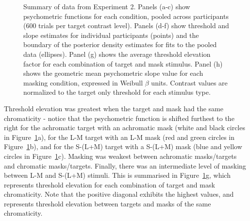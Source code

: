 \documentclass[
  letterpaper,
  DIV=11,
  numbers=noendperiod]{scrartcl}
\begin{document}
\begin{figure}


\caption{\label{fig-MCSfig}Summary of data from Experiment 2. Panels
(a-c) show psychometric functions for each condition, pooled across
participants (600 trials per target contrast level). Panels (d-f) show
threshold and slope estimates for individual participants (points) and
the boundary of the posterior density estimates for fits to the pooled
data (ellipses). Panel (g) shows the average threshold elevation factor
for each combination of target and mask stimulus. Panel (h) shows the
geometric mean psychometric slope value for each masking condition,
expressed in Weibull \(\beta\) units. Contrast values are normalized to
the target only threshold for each stimulus type.}

\end{figure}%

Threshold elevation was greatest when the target and mask had the same
chromaticity - notice that the psychometric function is shifted furthest
to the right for the achromatic target with an achromatic mask (white
and black circles in Figure~\ref{fig-MCSfig}a), for the L-M target with
an L-M mask (red and green circles in Figure~\ref{fig-MCSfig}b), and for
the S-(L+M) target with a S-(L+M) mask (blue and yellow circles in
Figure~\ref{fig-MCSfig}c). Masking was weakest between achromatic
masks/targets and chromatic masks/targets. Finally, there was an
intermediate level of masking between L-M and S-(L+M) stimuli. This is
summarised in Figure~\ref{fig-MCSfig}g, which represents threshold
elevation for each combination of target and mask chromaticity. Note
that the positive diagonal exhibits the highest values, and represents
threshold elevation between targets and masks of the same chromaticity.
\end{document}
